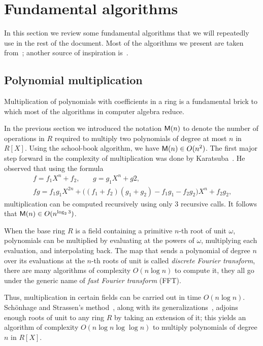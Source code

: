 \section{Fundamental algorithms}
\label{sec:fund-algor}
In this section we review some fundamental algorithms that we will
repeatedly use in the rest of the document. Most of the algorithms we
present are taken from~\cite{vzGG}; another source of inspiration
is~\cite{poly-formel}.

\subsection{Polynomial multiplication}
\label{sec:polyn-mult}
Multiplication of polynomials with coefficients in a ring is a
fundamental brick to which most of the algorithms in computer algebra
reduce.

In the previous section we introduced the notation $\mathsf{M}(n)$ to
denote the number of operations in $R$ required to multiply two
polynomials of degree at most $n$ in $R[X]$.  Using the school-book
algorithm, we have $\mathsf{M}(n) \in O(n^2)$. The first major step forward
in the complexity of multiplication was done by Karatsuba~\cite{karatsuba}. He observed that using
the formula
\begin{gather*}
  f = f_1X^n + f_2\text{,}\qquad g = g_1X^n + g2\text{,}\\
  fg = f_1g_1X^{2n} + \bigl((f_1+f_2)(g_1+g_2)-f_1g_1-f_2g_2\bigr)X^n + f_2g_2
  \text{,}
\end{gather*}
multiplication can be computed recursively using only $3$ recursive
calls.  It follows that $\mathsf{M}(n)\in O(n^{\log_23})$.

When the base ring $R$ is a field containing a primitive $n$-th root
of unit $\omega$, polynomials can be multiplied by evaluating at the
powers of $\omega$, multiplying each evaluation, and interpolating
back. The map that sends a polynomial of degree $n$ over its
evaluations at the $n$-th roots of unit is called
\textit{discrete Fourier transform},
there are many algorithms of complexity $O(n\log n)$ to compute it,
they all go under the generic name of
\textit{fast Fourier transform}
(FFT).

Thus, multiplication in certain fields can be carried out in time
$O(n\log n)$. Schönhage and Strassen's
method~\cite{schonage+strassen}, along with its
generalizations~\cite{schonhage77,cantor+kaltofen91}, adjoins enough
roots of unit to any ring $R$ by taking an extension of it; this
yields an algorithm of complexity $O(n\log n\log\log n)$ to multiply
polynomials of degree $n$ in $R[X]$.

